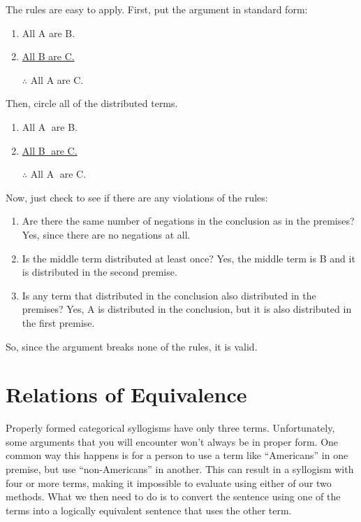 The rules are easy to apply. First, put the argument in standard form:

\begin{enumerate}
\item All A are B.
\item \underline{All B are C.}
\item [$\therefore$] All A are C.
\end{enumerate}

Then, circle all of the distributed terms.

\begin{enumerate}
\item All \textcircled{A} are B.
\item \underline{All \textcircled{B} are C.}
\item [$\therefore$] All \textcircled{A} are C.
\end{enumerate}

Now, just check to see if there are any violations of the rules:

\begin{enumerate}
\item Are there the same number of negations in the conclusion as in the premises? Yes, since there are no negations at all.
\item Is the middle term distributed at least once? Yes, the middle term is B and it is distributed in the second premise.
\item Is any term that distributed in the conclusion also distributed in the premises? Yes, A is distributed in the conclusion, but it is also distributed in the first premise.
\end{enumerate}


So, since the argument breaks none of the rules, it is valid.



\section{Relations of Equivalence}

Properly formed categorical syllogisms have only three terms. Unfortunately, some arguments that you will encounter won't always be in proper form. One common way this happens is for a person to use a term like \enquote{Americans} in one premise, but use \enquote{non-Americans} in another. This can result in a syllogism with four or more terms, making it impossible to evaluate using either of our two methods. What we then need to do is to convert the sentence using one of the terms into a logically equivalent sentence that uses the other term.


